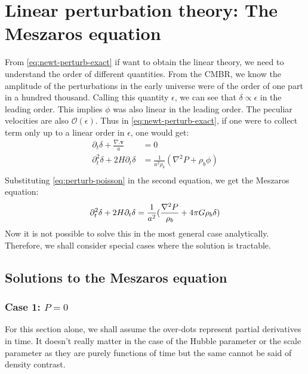 \documentclass[12pt,a4paper,twoside]{book}
\def\pa{{\partial}}
\begin{document}
	\section{Linear perturbation theory: The Meszaros equation}
		From \ref{eq:newt-perturb-exact} if want to obtain the linear theory, we need to understand the order of different quantities. From the CMBR, we know the amplitude of the perturbations in the early universe were of the order of one part in a hundred thousand. Calling this quantity $\epsilon$, we can see that $\delta\propto\epsilon$ in the leading order. This implies $\phi$ was also linear in the leading order. The peculiar velocities are also $\mathcal{O}(\epsilon)$. Thus in \ref{eq:newt-perturb-exact}, if one were to collect term only up to a linear order in $\epsilon$, one would get:
		$$
		\begin{aligned}
			\partial_t\delta+\frac{\nabla.\mathbf{v}}{a}&=0\\
			\pa_t^2\delta+2H\pa_t\delta&=\frac{1}{a^2\rho_b}(\nabla^2P+\rho_b\phi)\\
		\end{aligned}
		$$
		Substituting \ref{eq:perturb-poisson} in the second equation, we get the Meszaros equation:
		\begin{equation}
			\pa_t^2\delta+2H\pa_t\delta=\frac{1}{a^2}(\frac{\nabla^2P}{\rho_b}+4\pi G\rho_b\delta)\\
			\label{eq:meszaros}
		\end{equation}
		Now it is not possible to solve this in the most general case analytically. Therefore, we shall consider special cases where the solution is tractable.
		\subsection{Solutions to the Meszaros equation}
			\subsubsection{Case 1: $P=0$}
				For this section alone, we shall assume the over-dots represent partial derivatives in time. It doesn't really matter in the case of the Hubble parameter or the scale parameter as they are purely functions of time but the same cannot be said of density contrast. 
				
\end{document}
